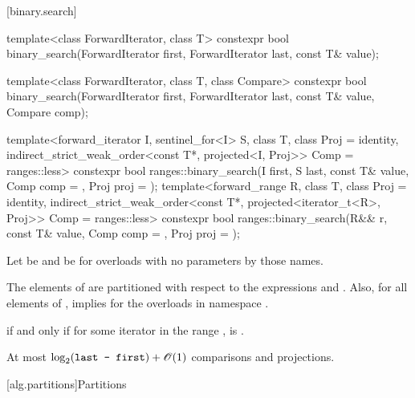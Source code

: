 [binary.search]{}

%
\begin{itemdecl}
template<class ForwardIterator, class T>
  constexpr bool
    binary_search(ForwardIterator first, ForwardIterator last,
                  const T& value);

template<class ForwardIterator, class T, class Compare>
  constexpr bool
    binary_search(ForwardIterator first, ForwardIterator last,
                  const T& value, Compare comp);

template<forward_iterator I, sentinel_for<I> S, class T, class Proj = identity,
         indirect_strict_weak_order<const T*, projected<I, Proj>> Comp = ranges::less>
  constexpr bool ranges::binary_search(I first, S last, const T& value, Comp comp = {},
                                       Proj proj = {});
template<forward_range R, class T, class Proj = identity,
         indirect_strict_weak_order<const T*, projected<iterator_t<R>, Proj>> Comp =
           ranges::less>
  constexpr bool ranges::binary_search(R&& r, const T& value, Comp comp = {},
                                       Proj proj = {});
\end{itemdecl}

\begin{itemdescr}
\pnum
Let  be  and
 be 
for overloads with no parameters by those names.

\pnum
\expects
The elements  of 
are partitioned with respect to the expressions
 and
.
Also, for all elements  of \tcode{[first, last)},
 implies 
for the overloads in namespace .

\pnum
\returns
{} if and only if
for some iterator  in the range ,
is .

\pnum
\complexity
At most $\log_2(\texttt{last - first}) + \mathscr{O}(1)$ comparisons and projections.
\end{itemdescr}

[alg.partitions]{Partitions}


